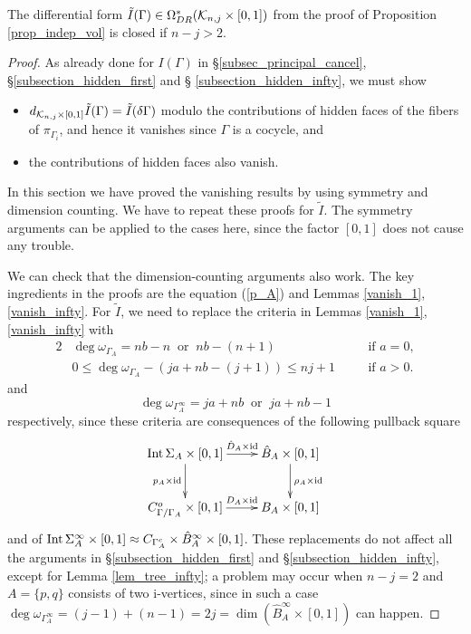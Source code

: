 \begin{lem}\label{tilde_I_closed}
The differential form $\tilde{I} (\Gamma ) \in \Omega^*_{DR}(\mathcal{K}_{n ,j} \times [0,1])$ from the proof of Proposition
\ref{prop_indep_vol} is closed if $n-j>2$.
\end{lem}


\begin{proof}
As already done for $I(\Gamma)$ in \S \ref{subsec_principal_cancel}, \S \ref{subsection_hidden_first} and \S
\ref{subsection_hidden_infty}, we must show
\begin{itemize}
\item
 $d_{\mathcal{K}_{n ,j}\times [0,1]}\tilde{I}(\Gamma ) = \tilde{I}(\delta \Gamma )$ modulo the contributions of hidden faces
 of the fibers of $\pi_{\Gamma_i}$, and hence it vanishes since $\Gamma$ is a cocycle, and
\item
 the contributions of hidden faces also vanish.
\end{itemize}
In this section we have proved the vanishing results by using symmetry and dimension counting.
We have to repeat these proofs for $\tilde{I}$.
The symmetry arguments can be applied to the cases here, since the factor $[0,1]$ does not cause any trouble.


We can check that the dimension-counting arguments also work.
The key ingredients in the proofs are the equation (\ref{p_A}) and Lemmas \ref{vanish_1}, \ref{vanish_infty}.
For $\tilde{I}$, we need to replace the criteria in Lemmas \ref{vanish_1}, \ref{vanish_infty} with
\begin{alignat*}{2}
 &\deg \omega_{\Gamma_A} = nb-n \ \text{ or } \ nb-(n+1) &\quad &\text{if } a=0, \\
 &0 \le \deg \omega_{\Gamma_A} - (ja+nb-(j+1)) \le nj+1  &\quad &\text{if } a>0.
\end{alignat*}
and
\[
 \deg \omega_{\Gamma^{\infty}_A} = ja+nb \ \text{ or } \ ja+nb-1
\]
respectively, since these criteria are consequences of the following pullback square
\[
\xymatrix{
  \Int \Sigma_A \times [0,1] \ar[r]^-{\hat{D}_A \times \id} \ar[d]_-{p_A \times \id}
   & \hat{B}_A \times [0,1] \ar[d]^-{\rho_A \times \id} \\
  C^o_{\Gamma / \Gamma_A} \times [0,1] \ar[r]^-{D_A \times \id} & B_A \times [0,1]
 }
\]
and of $\mathrm{Int}\, \Sigma^{\infty}_A \times [0,1] \approx C_{\Gamma^c_A} \times \hat{B}^{\infty}_A \times [0,1]$.
These replacements do not affect all the arguments in \S \ref{subsection_hidden_first} and
\S \ref{subsection_hidden_infty}, except for Lemma \ref{lem_tree_infty};
a problem may occur when $n-j=2$ and $A=\{ p,q\}$ consists of two i-vertices, since in such a case
$\deg \omega_{\Gamma^{\infty}_A}=(j-1)+(n-1)=2j=\dim (\hat{B}^{\infty}_A \times [0,1])$ can happen.
\end{proof}


